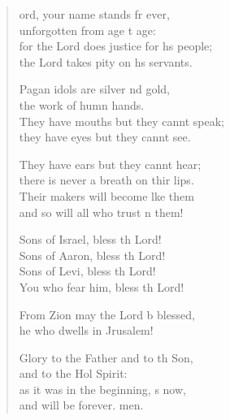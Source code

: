 \settowidth{\versewidth}{for the Lord does justice for his people; *}
\begin{verse}%
  \begin{patverse}
ord, your name stands fr ever,\Med\\
unforgotten from age t age:\\
for the Lord does justice for h\pointup{\i}s people;\Med\\
the Lord takes pity on h\pointup{\i}s servants.

Pagan idols are silver nd gold,\Med\\
the work of humn hands.\\
They have mouths but they cannt speak;\Med\\
they have eyes but they cannt see.

They have ears but they cannt hear;\Med\\
there is never a breath on thir lips.\\
Their makers will become l\pointup{\i}ke them\Med\\
and so will all who trust \pointup{\i}n them!

Sons of Israel, bless th Lord!\Med\\
Sons of Aaron, bless th Lord!\\
Sons of Levi, bless th Lord!\Med\\
You who fear him, bless th Lord!

From Zion may the Lord b blessed,\Med\\
he who dwells in Jrusalem!

Glory to the Father and to th Son,\Med\\
and to the Hol Spirit:\\
as it was in the beginning, \pointup{\i}s now,\Med\\
and will be forever. men.
  \end{patverse}
\end{verse}
